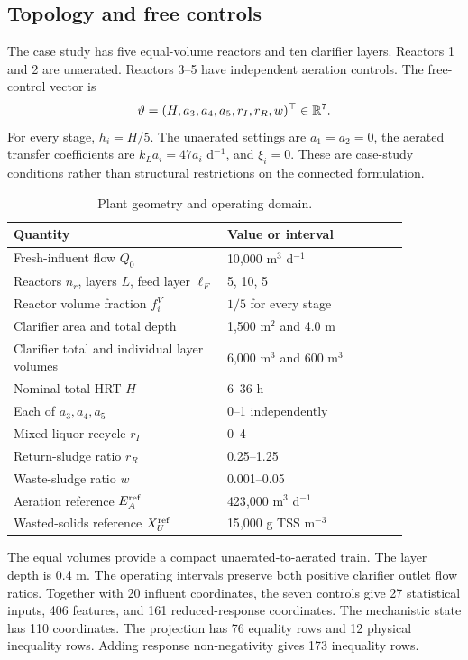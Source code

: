 \subsection{Topology and free controls}

The case study has five equal-volume reactors and ten clarifier layers. Reactors 1 and 2 are unaerated. Reactors 3--5 have independent aeration controls. The free-control vector is
\begin{equation}
\equationname{Seven freely varied controls of the connected-plant case}
\vartheta=(H,a_3,a_4,a_5,r_I,r_R,w)^\top\in\mathbb R^7.
\label{eq:plant_case_controls}
\end{equation}
For every stage, $h_i=H/5$. The unaerated settings are $a_1=a_2=0$, the aerated transfer coefficients are $k_La_i=47a_i$ d$^{-1}$, and $\xi_i=0$. These are case-study conditions rather than structural restrictions on the connected formulation.

\begin{table}[htbp]
\centering\small
\caption{Plant geometry and operating domain.}
\label{tab:plant_operating_domain}
\begin{tabular}{p{0.47\linewidth}p{0.40\linewidth}}
\toprule
Quantity & Value or interval\\
\midrule
Fresh-influent flow $Q_0$ & 10{,}000 m$^3$ d$^{-1}$\\
Reactors $n_r$, layers $L$, feed layer $\ell_F$ & 5, 10, 5\\
Reactor volume fraction $f_i^V$ & $1/5$ for every stage\\
Clarifier area and total depth & 1{,}500 m$^2$ and 4.0 m\\
Clarifier total and individual layer volumes & 6{,}000 m$^3$ and 600 m$^3$\\
Nominal total HRT $H$ & 6--36 h\\
Each of $a_3,a_4,a_5$ & 0--1 independently\\
Mixed-liquor recycle $r_I$ & 0--4\\
Return-sludge ratio $r_R$ & 0.25--1.25\\
Waste-sludge ratio $w$ & 0.001--0.05\\
Aeration reference $E_A^{\rm ref}$ & 423{,}000 m$^3$ d$^{-1}$\\
Wasted-solids reference $X_U^{\rm ref}$ & 15{,}000 g TSS m$^{-3}$\\
\bottomrule
\end{tabular}
\end{table}

The equal volumes provide a compact unaerated-to-aerated train. The layer depth is 0.4 m. The operating intervals preserve both positive clarifier outlet flow ratios. Together with 20 influent coordinates, the seven controls give 27 statistical inputs, 406 features, and 161 reduced-response coordinates. The mechanistic state has 110 coordinates. The projection has 76 equality rows and 12 physical inequality rows. Adding response non-negativity gives 173 inequality rows.

